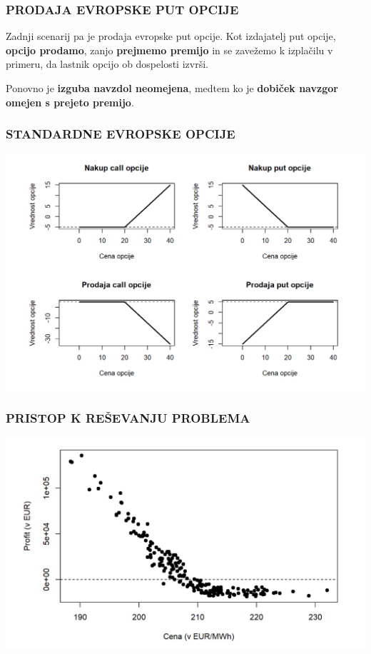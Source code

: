 \documentclass[10pt]{beamer}
\begin{document}
\begin{frame}
\frametitle{PRODAJA EVROPSKE PUT OPCIJE}

Zadnji scenarij pa je prodaja evropske put opcije. Kot izdajatelj put
opcije, \textbf{opcijo prodamo}, zanjo \textbf{prejmemo premijo} in se
zavežemo k izplačilu v primeru, da lastnik opcijo ob dospelosti izvrši.

Ponovno je \textbf{izguba navzdol neomejena}, medtem ko je
\textbf{dobiček navzgor omejen s prejeto premijo}.
\end{frame}


\begin{frame}
\frametitle{STANDARDNE EVROPSKE OPCIJE}
\includegraphics[width=1\textwidth]{vse4.png}
\end{frame}


\begin{frame}
\frametitle{PRISTOP K REŠEVANJU PROBLEMA}
\includegraphics[width=1\textwidth]{zacetek.png}
\end{frame}
\end{document}
